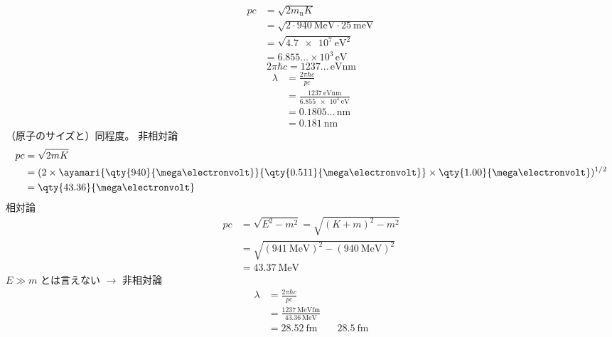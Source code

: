 \begin{align*}
  pc&=\sqrt{2m_{\mathrm{n}}K}\\
  &=\sqrt{2\cdot\qty{940}{\mega\electronvolt}\cdot\qty{25}{\milli\electronvolt}}\\
  &=\sqrt{\qty{4.7e7}{\electronvolt\squared}}\\
  &=6.855\ldots\times10^{3}\,\unit{\electronvolt}
\end{align*}
\[ 2\pi\hbar c=1237\ldots\,\unit{\electronvolt\nano\metre} \]
\begin{align*}
  \lambda&=\frac{2\pi\hbar c}{pc}\\
  &=\frac{\qty{1237}{\electronvolt\nano\metre}}{\qty{6.855e3}{\electronvolt}}\\
  &=0.1805\ldots\,\unit{\nano\metre}\\
  &=\qty{0.181}{\nano\metre}
\end{align*}
（原子のサイズと）同程度。
非相対論
\begin{align*}
  pc&=\sqrt{2mK}\\
  &=(2\times\ayamari{\qty{940}{\mega\electronvolt}}{\qty{0.511}{\mega\electronvolt}}\times\qty{1.00}{\mega\electronvolt})^{1/2}\\
  &=\qty{43.36}{\mega\electronvolt}
\end{align*}
相対論
\begin{align*}
  pc&=\sqrt{E^{2}-m^{2}}=\sqrt{(K+m)^{2}-m^{2}}\\
  &=\sqrt{(\qty{941}{\mega\electronvolt})^{2}-(\qty{940}{\mega\electronvolt})^{2}}\\
  &=\qty{43.37}{\mega\electronvolt}
\end{align*}
$E\gg m$ とは言えない $\to$ 非相対論
\begin{align*}
  \lambda&=\frac{2\pi\hbar c}{pc}\\
  &=\frac{\qty{1237}{\mega\electronvolt\femto\metre}}{\qty{43.36}{\mega\electronvolt}}\\
  &=\qty{28.52}{\femto\metre}\qquad\qty{28.5}{\femto\metre}
\end{align*}
